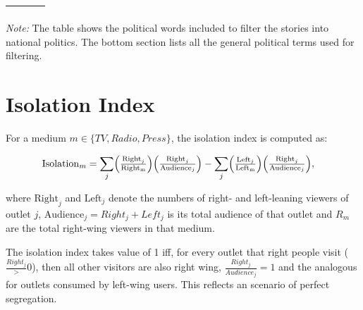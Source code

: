 \documentclass[12pt]{article}
\begin{document}
\begin{table}[!htb]
{\begin{longtable}{|l|l|l|l|}
{				}\\
				\hline
			\end{longtable}
		}
			\begin{tablenotes}
			\small
			\item \textit{Note:} The table shows the political words included to filter the stories into national politics. The bottom section lists all the general political terms used for filtering.
		\end{tablenotes}
		\label{table:politics}
	\end{table}
	
	


\newpage



\section{Isolation Index }
\label{sec:isolation}


For a medium $m\in \{TV,Radio,Press\}$, the isolation index is computed as:


\begin{equation}\label{eq:isolation}
	\begin{aligned}
		& \mathrm{Isolation}_m=%
		\sum_{j}
		\Bigl(\tfrac{\mathrm{Right}_j}{\mathrm{Right_m}}\Bigr)
		\Bigl(\tfrac{\mathrm{Right}_j}{\mathrm{Audience}_j}\Bigr)
		-
		\sum_{j}
		\Bigl(\tfrac{\mathrm{Left}_j}{\mathrm{Left_m}}\Bigr)
		\Bigl(\tfrac{\mathrm{Right}_j}{\mathrm{Audience}_j}\Bigr),
	\end{aligned}
\end{equation} 


%
where $\mathrm{Right}_j$ and $\mathrm{Left}_j$ denote the numbers of right- and left-leaning viewers of outlet $j$, $\text{Audience}_j=Right_j + Left_j$ is its total audience of that outlet and $R_m$ are the total right-wing viewers in that medium. 

The isolation index takes value of 1 iff, for every outlet that right people visit ($\frac{Right_j}>0$), then all other visitors are also right wing, $\frac{Right_j}{Audience_j}=1$ and the analogous for outlets consumed by left-wing users. This reflects an scenario of perfect segregation. 




	
	
\end{document}
